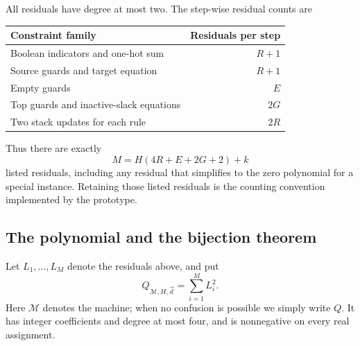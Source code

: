 \documentclass[11pt,letterpaper]{article}
\theoremstyle{definition}
\theoremstyle{remark}
\newcommand{\1}{\mathbf 1}
\begin{document}
All residuals have degree at most two. The step-wise residual counts are
\begin{center}
\begin{tabular}{@{}lr@{}}
\toprule
Constraint family & Residuals per step\\
\midrule
Boolean indicators and one-hot sum & $R+1$\\
Source guards and target equation & $R+1$\\
Empty guards & $E$\\
Top guards and inactive-slack equations & $2G$\\
Two stack updates for each rule & $2R$\\
\bottomrule
\end{tabular}
\end{center}
Thus there are exactly
\begin{equation}\label{lbh:eq:Mcount}
 M=H(4R+E+2G+2)+k
\end{equation}
listed residuals, including any residual that simplifies to the zero
polynomial for a special instance. Retaining those listed residuals is the
counting convention implemented by the prototype.

\subsection{The polynomial and the bijection theorem}
Let $L_1,\ldots,L_M$ denote the residuals above, and put
\begin{equation}\label{lbh:eq:quartic}
 Q_{\mathcal M,H,\vec d}=\sum_{i=1}^{M}L_i^2.
\end{equation}
Here $\mathcal M$ denotes the machine; when no confusion is possible
we simply write $Q$. It has integer
coefficients and degree at most four, and is nonnegative on every real
assignment.
\end{document}
